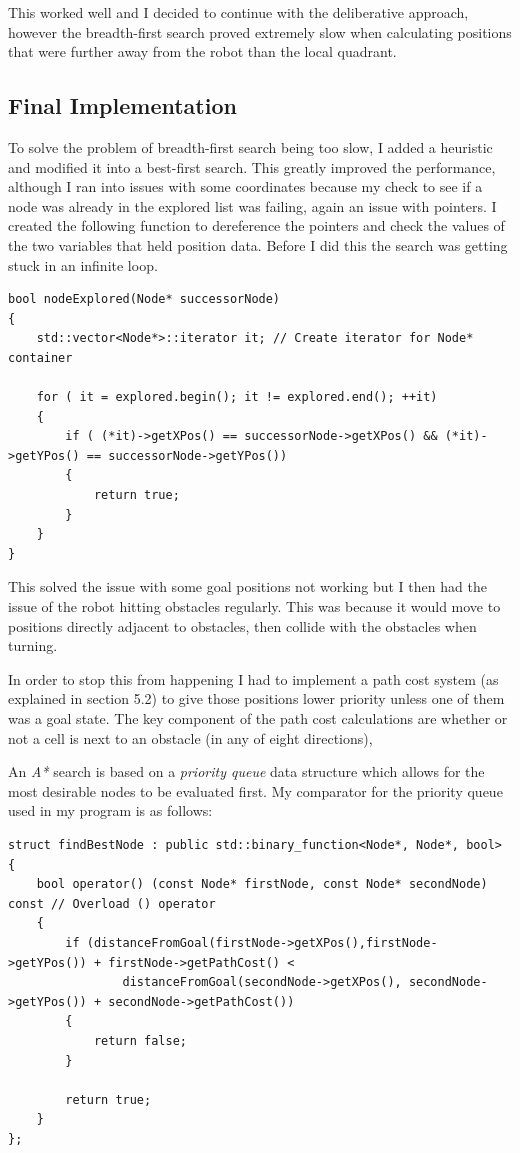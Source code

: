 \documentclass[a4paper,12pt]{article}
\begin{document}
This worked well and I decided to continue with the deliberative approach, however the breadth-first search proved extremely slow when calculating positions that were further away from the robot than the local quadrant.
\subsection{Final Implementation}
To solve the problem of breadth-first search being too slow, I added a heuristic and modified it into a best-first search. This greatly improved the performance, although I ran into issues with some coordinates because my check to see if a node was already in the explored list was failing, again an issue with pointers. I created the following function to dereference the pointers and check the values of the two variables that held position data. Before I did this the search was getting stuck in an infinite loop.

\begin{lstlisting}
bool nodeExplored(Node* successorNode)
{
    std::vector<Node*>::iterator it; // Create iterator for Node* container 

    for ( it = explored.begin(); it != explored.end(); ++it)
    {
        if ( (*it)->getXPos() == successorNode->getXPos() && (*it)->getYPos() == successorNode->getYPos())
        {
            return true;
        }
    }
}
\end{lstlisting}

This solved the issue with some goal positions not working but I then had the issue of the robot hitting obstacles regularly. This was because it would move to positions directly adjacent to obstacles, then collide with the obstacles when turning. 

In order to stop this from happening I had to implement a path cost system (as explained in section 5.2) to give those positions lower priority unless one of them was a goal state. The key component of the path cost calculations are whether or not a cell is next to an obstacle (in any of eight directions),

An \textit{A*} search is based on a \textit{priority queue} data structure which allows for the most desirable nodes to be evaluated first. My comparator for the priority queue used in my program is as follows:

\begin{lstlisting}
struct findBestNode : public std::binary_function<Node*, Node*, bool>
{
    bool operator() (const Node* firstNode, const Node* secondNode) const // Overload () operator
    {
        if (distanceFromGoal(firstNode->getXPos(),firstNode->getYPos()) + firstNode->getPathCost() < 
                distanceFromGoal(secondNode->getXPos(), secondNode->getYPos()) + secondNode->getPathCost())
        {
            return false;
        }

        return true;
    }
};
\end{lstlisting}
\end{document}
